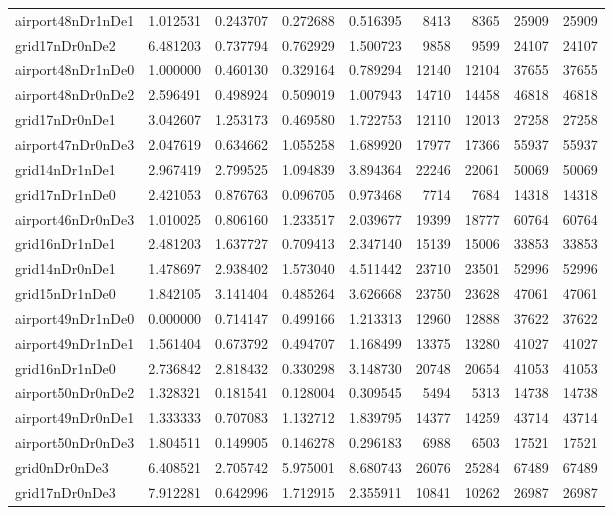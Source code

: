 \begin{longtable}{|l|r|r|r|r|r|r|r|r|}
airport48nDr1nDe1 & 1.012531 & 0.243707 & 0.272688 & 0.516395 & 8413 & 8365 & 25909 & 25909 \\
grid17nDr0nDe2 & 6.481203 & 0.737794 & 0.762929 & 1.500723 & 9858 & 9599 & 24107 & 24107 \\
airport48nDr1nDe0 & 1.000000 & 0.460130 & 0.329164 & 0.789294 & 12140 & 12104 & 37655 & 37655 \\
airport48nDr0nDe2 & 2.596491 & 0.498924 & 0.509019 & 1.007943 & 14710 & 14458 & 46818 & 46818 \\
grid17nDr0nDe1 & 3.042607 & 1.253173 & 0.469580 & 1.722753 & 12110 & 12013 & 27258 & 27258 \\
airport47nDr0nDe3 & 2.047619 & 0.634662 & 1.055258 & 1.689920 & 17977 & 17366 & 55937 & 55937 \\
grid14nDr1nDe1 & 2.967419 & 2.799525 & 1.094839 & 3.894364 & 22246 & 22061 & 50069 & 50069 \\
grid17nDr1nDe0 & 2.421053 & 0.876763 & 0.096705 & 0.973468 & 7714 & 7684 & 14318 & 14318 \\
airport46nDr0nDe3 & 1.010025 & 0.806160 & 1.233517 & 2.039677 & 19399 & 18777 & 60764 & 60764 \\
grid16nDr1nDe1 & 2.481203 & 1.637727 & 0.709413 & 2.347140 & 15139 & 15006 & 33853 & 33853 \\
grid14nDr0nDe1 & 1.478697 & 2.938402 & 1.573040 & 4.511442 & 23710 & 23501 & 52996 & 52996 \\
grid15nDr1nDe0 & 1.842105 & 3.141404 & 0.485264 & 3.626668 & 23750 & 23628 & 47061 & 47061 \\
airport49nDr1nDe0 & 0.000000 & 0.714147 & 0.499166 & 1.213313 & 12960 & 12888 & 37622 & 37622 \\
airport49nDr1nDe1 & 1.561404 & 0.673792 & 0.494707 & 1.168499 & 13375 & 13280 & 41027 & 41027 \\
grid16nDr1nDe0 & 2.736842 & 2.818432 & 0.330298 & 3.148730 & 20748 & 20654 & 41053 & 41053 \\
airport50nDr0nDe2 & 1.328321 & 0.181541 & 0.128004 & 0.309545 & 5494 & 5313 & 14738 & 14738 \\
airport49nDr0nDe1 & 1.333333 & 0.707083 & 1.132712 & 1.839795 & 14377 & 14259 & 43714 & 43714 \\
airport50nDr0nDe3 & 1.804511 & 0.149905 & 0.146278 & 0.296183 & 6988 & 6503 & 17521 & 17521 \\
grid0nDr0nDe3 & 6.408521 & 2.705742 & 5.975001 & 8.680743 & 26076 & 25284 & 67489 & 67489 \\
grid17nDr0nDe3 & 7.912281 & 0.642996 & 1.712915 & 2.355911 & 10841 & 10262 & 26987 & 26987 \\

\end{longtable}
